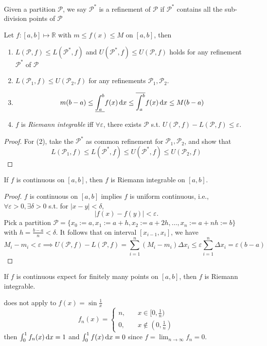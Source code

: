 \begin{definition}[Refinement]
Given a partition $\mathcal{P}$, we say $\mathcal{P}^*$ is a refinement of $\mathcal{P}$ if $\mathcal{P}^*$ contains all the sub-division points of $\mathcal{P}$
\end{definition}
\begin{proposition}
Let $f: [a,b]\mapsto\mathbb{R}$ with $m\le f(x)\le M$ on $[a,b]$, then
\begin{enumerate}
\item
$L(\mathcal{P},f)\le L(\mathcal{P}^*,f)$ and $U(\mathcal{P}^*,f)\le U(\mathcal{P},f)$ holds for any refinement $\mathcal{P}^*$ of $\mathcal{P}$
\item
$L(\mathcal{P}_1,f)\le U(\mathcal{P}_2,f)$ for any refinements $\mathcal{P}_1,\mathcal{P}_2$.
\item
\[
m(b-a)\le \underline{\int_{a}^{b}}f(x)\,\mathrm{d} x\le
\overline{\int_{a}^{b}}f(x)\,\mathrm{d} x\le M(b-a)
\]
\item
$f$ is \emph{Riemann integrable} iff $\forall\varepsilon$, there exists $\mathcal{P}$ s.t. $U(\mathcal{P},f) - L(\mathcal{P},f)\le\varepsilon$.
\end{enumerate}
\end{proposition}
\begin{proof}
For (2), take the $\mathcal{P}^*$ as common refinement for $\mathcal{P}_1,\mathcal{P}_2$, and show that
\[
L(\mathcal{P}_1,f)\le 
L(\mathcal{P}^*,f)\le U(\mathcal{P}^*,f)\le
U(\mathcal{P}_2,f)
\]
\end{proof}
\begin{theorem}
If $f$ is continuous on $[a,b]$, then $f$ is Riemann integrable on $[a,b]$.
\end{theorem}

\begin{proof}
$f$ is continuous on $[a,b]$ implies $f$ is uniform continuous, i.e.,$\forall \varepsilon>0,\exists\delta>0$ s.t. for $|x-y|<\delta$,
\[
|f(x)-f(y)|<\varepsilon.
\]
Pick a partition $\mathcal{P}=\{x_0:=a,x_1:=a+h,x_2:=a+2h,\dots,x_n:=a+nh:=b\}$ with $h=\frac{b-a}{n}<\delta$. It follows that on interval $[x_{i-1},x_i]$, we have
\[
M_i-m_i<\varepsilon\implies
U(\mathcal{P},f) - L(\mathcal{P},f) = \sum_{i=1}^n(M_i-m_i)\Delta x_i\le\varepsilon\sum_{i=1}^n\Delta x_i=\varepsilon(b-a)
\]
\end{proof}
\begin{corollary}
If $f$ is continuous expect for finitely many points on $[a,b]$, then $f$ is Riemann integrable.
\end{corollary}
does not apply to $f(x)=\sin\frac{1}{x}$
\[
f_n(x)=\left\{
\begin{aligned}
n,&\quad x\in[0,\frac{1}{n})\\
0,&\quad x\notin(0,\frac{1}{n})
\end{aligned}
\right.
\]
then $\int_0^1f_n(x)\,\mathrm{d} x=1$ and $\int_0^1f(x)\,\mathrm{d} x=0$ since $f=\lim_{n\to\infty}f_n=0$.

